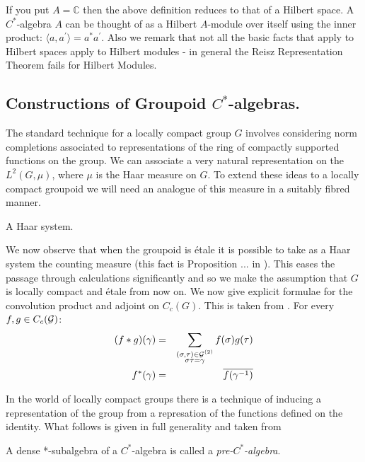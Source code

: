 \begin{remark}
If you put $A= \mathbb{C}$ then the above definition reduces to that of a Hilbert space. A $C^{*}$-algebra $A$ can be thought of as a Hilbert $A$-module over itself using the inner product: $\langle a, a^{'} \rangle = a^{*}a^{'}$. Also we remark that not all the basic facts that apply to Hilbert spaces apply to Hilbert modules - in general the Reisz Representation Theorem fails for Hilbert Modules.
\end{remark}

\subsection{Constructions of Groupoid \texorpdfstring{$C^{*}$}{C*}-algebras.} The standard technique for a locally compact group $G$ involves considering norm completions associated to representations of the ring of compactly supported functions on the group. We can associate a very natural representation on the $L^{2}(G,\mu)$, where $\mu$ is the Haar measure on $G$. To extend these ideas to a locally compact groupoid we will need an analogue of this measure in a suitably fibred manner.

\begin{definition}
A Haar system.
\end{definition}

We now observe that when the groupoid is \'etale it is possible to take as a Haar system the counting measure (this fact is Proposition ...  in \cite{}). This eases the passage through calculations significantly and so we make the assumption that $G$ is locally compact and \'etale from now on. We now give explicit formulae for the convolution product and adjoint on $C_{c}(G)$. This is taken from \cite{MR2419901}. For every $f,g \in C_{c}(\mathcal{G})$:
\begin{eqnarray*}
(f \ast g)(\gamma) & = & \sum_{\substack{(\sigma,\tau) \in \mathcal{G}^{(2)}\\ \sigma\tau=\gamma}}f(\sigma)g(\tau)\\
f^{*}(\gamma) & = & \overline{f(\gamma^{-1})} 
\end{eqnarray*}

In the world of locally compact groups there is a technique of inducing a representation of the group from a represation of the functions defined on the identity. What follows is given in full generality and taken from \cite[Appendix D]{MR1724106}
\begin{definition}
A dense *-subalgebra of a $C^{*}$-algebra is called a \textit{pre-$C^{*}$-algebra}.
\end{definition}

